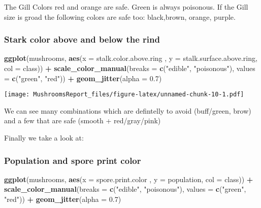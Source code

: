 \documentclass[]{article}
\newenvironment{Shaded}{\begin{snugshade}}{\end{snugshade}}
\newcommand{\KeywordTok}[1]{\textcolor[rgb]{0.13,0.29,0.53}{\textbf{#1}}}
\newcommand{\DataTypeTok}[1]{\textcolor[rgb]{0.13,0.29,0.53}{#1}}
\newcommand{\FloatTok}[1]{\textcolor[rgb]{0.00,0.00,0.81}{#1}}
\newcommand{\StringTok}[1]{\textcolor[rgb]{0.31,0.60,0.02}{#1}}
\newcommand{\OperatorTok}[1]{\textcolor[rgb]{0.81,0.36,0.00}{\textbf{#1}}}
\newcommand{\NormalTok}[1]{#1}
\begin{document}
The Gill Colors red and orange are safe. Green is always poisonous. If
the Gill size is groad the following colors are safe too: black,brown,
orange, purple.

\subsubsection{Stark color above and below the
rind}\label{stark-color-above-and-below-the-rind}

\begin{Shaded}
\begin{Highlighting}[]
\KeywordTok{ggplot}\NormalTok{(mushrooms, }\KeywordTok{aes}\NormalTok{(}\DataTypeTok{x =}\NormalTok{ stalk.color.above.ring , }\DataTypeTok{y =}\NormalTok{ stalk.surface.above.ring, }\DataTypeTok{col =}\NormalTok{ class)) }\OperatorTok{+}\StringTok{ }
\StringTok{  }\KeywordTok{scale_color_manual}\NormalTok{(}\DataTypeTok{breaks =} \KeywordTok{c}\NormalTok{(}\StringTok{"edible"}\NormalTok{, }\StringTok{"poisonous"}\NormalTok{), }
                     \DataTypeTok{values =} \KeywordTok{c}\NormalTok{(}\StringTok{"green"}\NormalTok{, }\StringTok{"red"}\NormalTok{)) }\OperatorTok{+}
\StringTok{  }\KeywordTok{geom_jitter}\NormalTok{(}\DataTypeTok{alpha =} \FloatTok{0.7}\NormalTok{) }
\end{Highlighting}
\end{Shaded}

\texttt{[image: MushroomsReport\_files/figure-latex/unnamed-chunk-10-1.pdf]}

We can see many combinations which are defintelly to avoid (buff/green,
brow) and a few that are safe (smooth + red/gray/pink)

Finally we take a look at:

\subsubsection{Population and spore print
color}\label{population-and-spore-print-color}

\begin{Shaded}
\begin{Highlighting}[]
\KeywordTok{ggplot}\NormalTok{(mushrooms, }\KeywordTok{aes}\NormalTok{(}\DataTypeTok{x =}\NormalTok{ spore.print.color , }\DataTypeTok{y =}\NormalTok{ population, }\DataTypeTok{col =}\NormalTok{ class)) }\OperatorTok{+}\StringTok{ }
\StringTok{  }\KeywordTok{scale_color_manual}\NormalTok{(}\DataTypeTok{breaks =} \KeywordTok{c}\NormalTok{(}\StringTok{"edible"}\NormalTok{, }\StringTok{"poisonous"}\NormalTok{), }
                     \DataTypeTok{values =} \KeywordTok{c}\NormalTok{(}\StringTok{"green"}\NormalTok{, }\StringTok{"red"}\NormalTok{)) }\OperatorTok{+}
\StringTok{  }\KeywordTok{geom_jitter}\NormalTok{(}\DataTypeTok{alpha =} \FloatTok{0.7}\NormalTok{) }
\end{Highlighting}
\end{Shaded}
\end{document}
